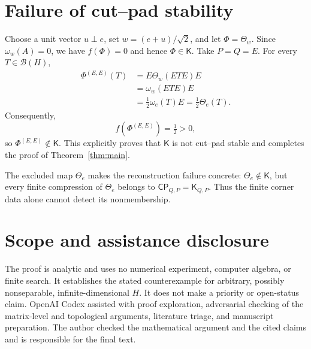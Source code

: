 \documentclass[11pt]{article}
\newcommand{\B}{\mathcal B}
\newcommand{\CP}{\mathsf{CP}}
\newcommand{\Kcone}{\mathsf K}
\begin{document}
\section{Failure of cut--pad stability}

Choose a unit vector $u\perp e$, set $w=(e+u)/\sqrt2$, and let
$\Phi=\Theta_w$.  Since $\omega_w(A)=0$, we have $f(\Phi)=0$ and hence
$\Phi\in\Kcone$.  Take $P=Q=E$.  For every $T\in\B(H)$,
\begin{align*}
 \Phi^{(E,E)}(T)
  &=E\Theta_w(ETE)E \\
  &=\omega_w(ETE)E \\
  &=\tfrac12\omega_e(T)E
   =\tfrac12\Theta_e(T).
\end{align*}
Consequently,
\[
 f(\Phi^{(E,E)})=\tfrac12>0,
\]
so $\Phi^{(E,E)}\notin\Kcone$.  This explicitly proves that $\Kcone$ is not
cut--pad stable and completes the proof of Theorem~\ref{thm:main}.

The excluded map $\Theta_e$ makes the reconstruction failure concrete:
$\Theta_e\notin\Kcone$, but every finite compression of $\Theta_e$ belongs to
$\CP_{Q,P}=\Kcone_{Q,P}$.  Thus the finite corner data alone cannot detect its
nonmembership.

\section*{Scope and assistance disclosure}

The proof is analytic and uses no numerical experiment, computer algebra, or
finite search.  It establishes the stated counterexample for arbitrary,
possibly nonseparable, infinite-dimensional $H$.  It does not make a priority
or open-status claim.  OpenAI Codex assisted with proof exploration,
adversarial checking of the matrix-level and topological arguments,
literature triage, and manuscript preparation.  The author checked the
mathematical argument and the cited claims and is responsible for the final
text.



\end{document}
